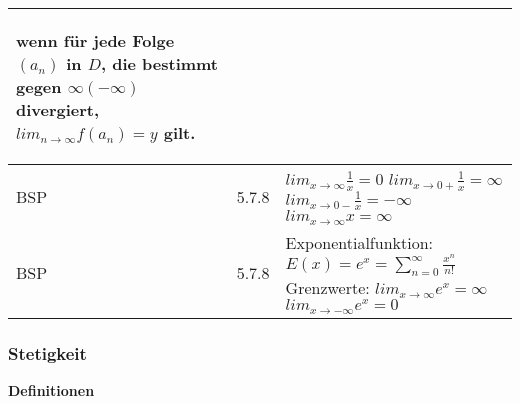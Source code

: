 \begin{longtable}{p{0.75cm} p{1cm} p{16cm}}
\begin{itemize}[topsep=-0.5cm]
                                        wenn für jede Folge $(a_n)$ in $D$, die bestimmt gegen $\infty (-\infty)$ divergiert,
                                        $lim_{n \rightarrow \infty} f(a_n) = y$ gilt.
                        \end{itemize} \vspace{-0cm} \\
        \midrule
        BSP & 5.7.8 &   $lim_{x \rightarrow \infty} \frac{1}{x} = 0$ \hfill \break
                        $lim_{x \rightarrow 0+} \frac{1}{x} = \infty$ \hfill \break
                        $lim_{x \rightarrow 0-} \frac{1}{x} = -\infty$ \hfill \break
                        $lim_{x \rightarrow \infty} x = \infty$ \\
        \midrule
        BSP & 5.7.8 &   Exponentialfunktion: $E(x) = e^x = \sum^{\infty}_{n=0} \frac{x^n}{n!}$ \hfill \break
        Grenzwerte: \hfill \break
        $lim_{x \rightarrow \infty} e^x = \infty$ \hfill \break
        $lim_{x \rightarrow -\infty} e^x = 0$ \\

        \bottomrule

    \end{longtable}

\subsubsection{Stetigkeit}
    \noindent
    \textbf{Definitionen}
      
